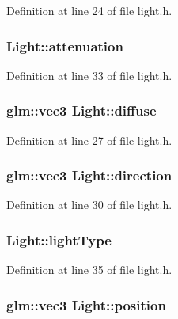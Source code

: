 Definition at line 24 of file light.\+h.

\hypertarget{class_light_a6684545092d9a9b80422a6612e5cac26}{}
\subsubsection[{attenuation}]{ Light\+::attenuation}\label{class_light_a6684545092d9a9b80422a6612e5cac26}


Definition at line 33 of file light.\+h.

\hypertarget{class_light_ad47b5347556fd8cd9ebdc60fdfed196b}{}
\subsubsection[{diffuse}]{\setlength{\rightskip}{0pt plus 5cm}glm\+::vec3 Light\+::diffuse}\label{class_light_ad47b5347556fd8cd9ebdc60fdfed196b}


Definition at line 27 of file light.\+h.

\hypertarget{class_light_a494230a45b5cfa2f9fb54dbd4de3812b}{}
\subsubsection[{direction}]{\setlength{\rightskip}{0pt plus 5cm}glm\+::vec3 Light\+::direction}\label{class_light_a494230a45b5cfa2f9fb54dbd4de3812b}


Definition at line 30 of file light.\+h.

\hypertarget{class_light_ab0c279c927973443f7b52fc924b489aa}{}
\subsubsection[{light\+Type}]{ Light\+::light\+Type}\label{class_light_ab0c279c927973443f7b52fc924b489aa}


Definition at line 35 of file light.\+h.

\hypertarget{class_light_a89bffe071ec6431a21c5b54021fe08d6}{}
\subsubsection[{position}]{\setlength{\rightskip}{0pt plus 5cm}glm\+::vec3 Light\+::position}\label{class_light_a89bffe071ec6431a21c5b54021fe08d6}


